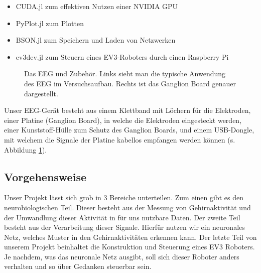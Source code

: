\documentclass[11pt]{scrartcl}
\begin{document}
\begin{itemize}
\begin{itemize}
			\item CUDA.jl zum effektiven Nutzen einer NVIDIA GPU
				\cite{CUDA}
			
			\item PyPlot.jl zum Plotten
				\cite{pyplot}
			
			\item BSON.jl zum Speichern und Laden von Netzwerken
			
			\item ev3dev.jl zum Steuern eines EV3-Roboters durch einen Raspberry Pi
				\cite{ev3dev}
			
		\end{itemize}

	\end{itemize}

	\begin{figure}[h!]
		\caption{Das EEG und Zubehör. Links sieht man die typische Anwendung des EEG im Versuchsaufbau. Rechts ist das Ganglion Board genauer dargestellt.}
		\label{EEG-Zubehor}
	\end{figure}

	Unser EEG-Gerät besteht aus einem Klettband mit Löchern für die Elektroden, einer Platine (Ganglion Board), in welche die Elektroden eingesteckt werden, einer Kunststoff-Hülle zum Schutz des Ganglion Boards, und einem USB-Dongle, mit welchem die Signale der Platine kabellos empfangen werden können (s. Abbildung \ref{EEG-Zubehor}).

	\subsection{Vorgehensweise}

	Unser Projekt lässt sich grob in 3 Bereiche unterteilen. Zum einen gibt es den neurobiologischen Teil. Dieser besteht aus der Messung von Gehirnaktivität und der Umwandlung dieser Aktivität in für uns nutzbare Daten. Der zweite Teil besteht aus der Verarbeitung dieser Signale. Hierfür nutzen wir ein neuronales Netz, welches Muster in den Gehirnaktivitäten erkennen kann. Der letzte Teil von unserem Projekt beinhaltet die Konstruktion und Steuerung eines EV3 Roboters. Je nachdem, was das neuronale Netz ausgibt, soll sich dieser Roboter anders verhalten und so über Gedanken steuerbar sein.	
\end{document}
